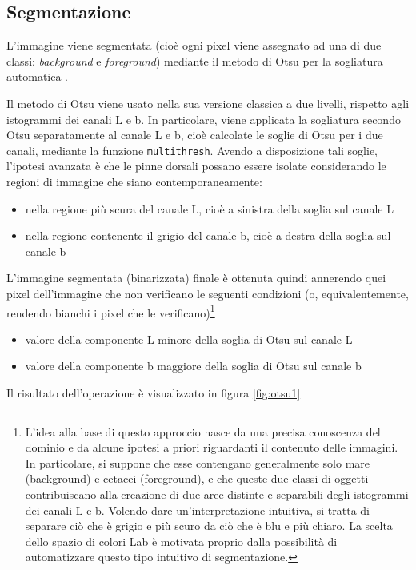 \subsection*{Segmentazione}
L'immagine viene segmentata (cioè ogni pixel viene assegnato ad una di due classi: \textit{background} e \textit{foreground}) mediante il metodo di Otsu per la sogliatura automatica \cite{otsu}.

Il metodo di Otsu viene usato nella sua versione classica a due livelli, rispetto agli istogrammi dei canali L e b. In particolare, viene applicata la sogliatura secondo Otsu separatamente al canale L e b, cioè calcolate le soglie di Otsu per i due canali, mediante la funzione \verb|multithresh|.
Avendo a disposizione tali soglie, l’ipotesi avanzata è che le pinne dorsali possano essere
isolate considerando le regioni di immagine che siano contemporaneamente:
\begin{itemize}
\item nella regione più scura del canale L, cioè a sinistra della soglia sul canale L
\item nella regione contenente il grigio del canale b, cioè a destra della soglia sul canale b
\end{itemize}
L'immagine segmentata (binarizzata) finale è ottenuta quindi annerendo quei pixel dell'immagine che non verificano le seguenti condizioni (o, equivalentemente, rendendo bianchi i pixel che le verificano)\footnote{L’idea alla base di questo approccio nasce da una precisa conoscenza del dominio e da alcune ipotesi a priori riguardanti il contenuto delle immagini. In particolare, si suppone
che esse contengano generalmente solo mare (background) e cetacei (foreground),
e che queste due classi di oggetti contribuiscano alla creazione di due aree distinte e
separabili degli istogrammi dei canali L e b. Volendo dare un’interpretazione intuitiva,
si tratta di separare ciò che è grigio e più scuro da ciò che è blu e più chiaro. La scelta
dello spazio di colori Lab è motivata proprio dalla possibilità di automatizzare questo
tipo intuitivo di segmentazione.}
\begin{itemize}
\item valore della componente L minore della soglia di Otsu sul canale L
\item valore della componente b maggiore della soglia di Otsu sul canale b
\end{itemize}

\noindent Il risultato dell'operazione è visualizzato in figura \ref{fig:otsu1}

